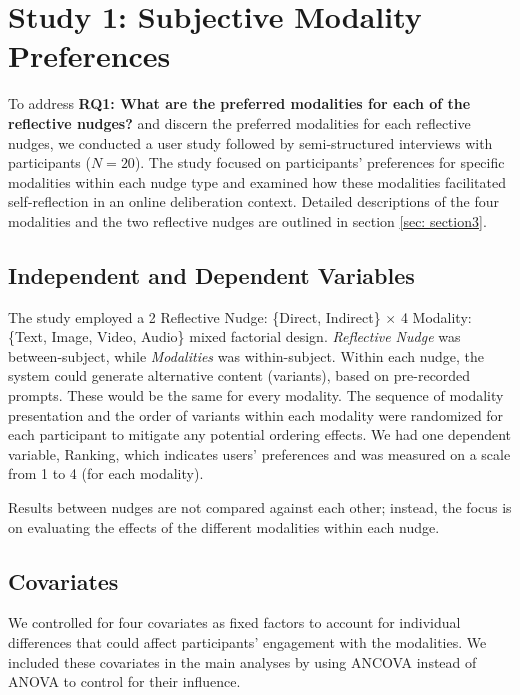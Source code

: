 \section{Study 1: Subjective Modality Preferences}

To address \textbf{RQ1: What are the preferred modalities for each of the reflective nudges?} and discern the preferred modalities for each reflective nudges, we conducted a user study followed by semi-structured interviews with participants ($N=20$). The study focused on participants' preferences for specific modalities within each nudge type and examined how these modalities facilitated self-reflection in an online deliberation context. Detailed descriptions of the four modalities and the two reflective nudges are outlined in section \ref{sec: section3}. 

\subsection{Independent and Dependent Variables}
The study employed a 2 Reflective Nudge: \{Direct, Indirect\} $\times$ 4 Modality: \{Text, Image, Video, Audio\} mixed factorial design. \textit{Reflective Nudge} was between-subject, while \textit{Modalities} was within-subject. 
Within each nudge, the system could generate alternative content (variants), based on pre-recorded prompts. These would be the same for every modality.
The sequence of modality presentation and the order of variants within each modality were randomized for each participant to mitigate any potential ordering effects. 
We had one dependent variable, Ranking, which indicates users' preferences and was measured on a scale from 1 to 4 (for each modality). 

Results between nudges are not compared against each other; instead, the focus is on evaluating the effects of the different modalities within each nudge.

\subsection{Covariates}
\label{sec: Covariates}
We controlled for four covariates as fixed factors to account for individual differences that could affect participants' engagement with the modalities.
We included these covariates in the main analyses by using ANCOVA instead of ANOVA to control for their influence.

